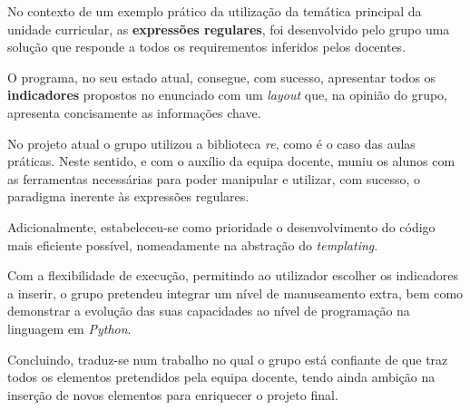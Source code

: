 No contexto de um exemplo prático da utilização da temática principal da 
unidade curricular, as \textbf{expressões regulares}, foi desenvolvido pelo grupo 
uma solução que responde a todos os requirementos inferidos pelos docentes.

O programa, no seu estado atual, consegue, com sucesso, apresentar todos os \textbf{indicadores}
propostos no enunciado com um \textit{layout} que, na opinião do grupo, apresenta concisamente
as informações chave.

No projeto atual o grupo utilizou a biblioteca \textit{re}, como é o caso das aulas práticas.
Neste sentido, e com o auxílio da equipa docente, muniu os alunos com as ferramentas 
necessárias para poder manipular e utilizar, com sucesso, o paradigma inerente às expressões regulares.

Adicionalmente, estabeleceu-se como prioridade o desenvolvimento do código mais eficiente possível,
nomeadamente na abstração do \textit{templating}.

Com a flexibilidade de execução, permitindo ao utilizador escolher os indicadores a inserir, o 
grupo pretendeu integrar um nível de manuseamento extra, bem como demonstrar a evolução das 
suas capacidades ao nível de programação na linguagem em \textit{Python}.

Concluindo, traduz-se num trabalho no qual o grupo está confiante de que traz todos os elementos 
pretendidos pela equipa docente, tendo ainda ambição na inserção de novos elementos para enriquecer
o projeto final.
